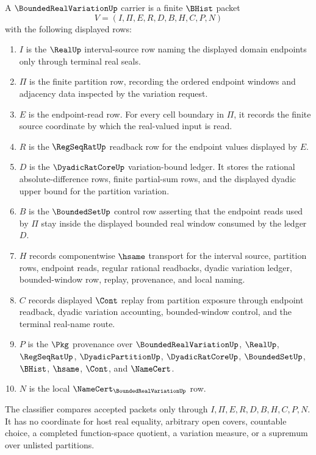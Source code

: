 \begin{definition}
\label{def:bounded-real-variation-carrier}
A $\BoundedRealVariationUp$ carrier is a finite $\BHist$ packet
$$
V=(I,\Pi,E,R,D,B,H,C,P,N)
$$
with the following displayed rows:
\begin{enumerate}
\item $I$ is the $\RealUp$ interval-source row naming the displayed domain endpoints only through terminal real seals.
\item $\Pi$ is the finite partition row, recording the ordered endpoint windows and adjacency data inspected by the variation request.
\item $E$ is the endpoint-read row. For every cell boundary in $\Pi$, it records the finite source coordinate by which the real-valued input is read.
\item $R$ is the $\RegSeqRatUp$ readback row for the endpoint values displayed by $E$.
\item $D$ is the $\DyadicRatCoreUp$ variation-bound ledger. It stores the rational absolute-difference rows, finite partial-sum rows, and the displayed dyadic upper bound for the partition variation.
\item $B$ is the $\BoundedSetUp$ control row asserting that the endpoint reads used by $\Pi$ stay inside the displayed bounded real window consumed by the ledger $D$.
\item $H$ records componentwise $\hsame$ transport for the interval source, partition rows, endpoint reads, regular rational readbacks, dyadic variation ledger, bounded-window row, replay, provenance, and local naming.
\item $C$ records displayed $\Cont$ replay from partition exposure through endpoint readback, dyadic variation accounting, bounded-window control, and the terminal real-name route.
\item $P$ is the $\Pkg$ provenance over $\BoundedRealVariationUp$, $\RealUp$, $\RegSeqRatUp$, $\DyadicPartitionUp$, $\DyadicRatCoreUp$, $\BoundedSetUp$, $\BHist$, $\hsame$, $\Cont$, and $\NameCert$.
\item $N$ is the local $\NameCert_{\BoundedRealVariationUp}$ row.
\end{enumerate}
The classifier compares accepted packets only through $I,\Pi,E,R,D,B,H,C,P,N$. It has no coordinate for host real equality, arbitrary open covers, countable choice, a completed function-space quotient, a variation measure, or a supremum over unlisted partitions.
\end{definition}

